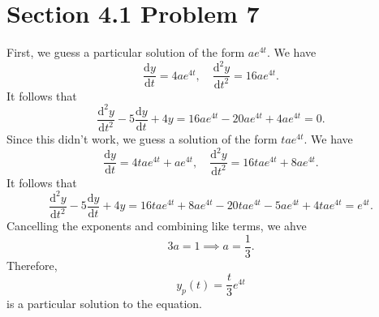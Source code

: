 \documentclass[11pt, letterpaper]{report}
\begin{document}
\section*{Section 4.1 Problem 7}
First, we guess a particular solution of the form $ae^{4t}$. We have
\[
	\frac{\mathrm{d}y}{\mathrm{d}t} =4ae^{4t},\quad \frac{\mathrm{d}^2y}{\mathrm{d}t^2} =16ae^{4t}
.\]
It follows that
\[
	\frac{\mathrm{d}^2y}{\mathrm{d}t^2} -5 \frac{\mathrm{d}y}{\mathrm{d}t} +4y=16ae^{4t}-20ae^{4t}+4ae^{4t}=0
.\]
Since this didn't work, we guess a solution of the form $tae^{4t}$. We have
\[
	\frac{\mathrm{d}y}{\mathrm{d}t} =4tae^{4t}+ae^{4t},\quad \frac{\mathrm{d}^2y}{\mathrm{d}t^2} =16tae^{4t}+8ae^{4t}
.\]
It follows that
\[
	\frac{\mathrm{d}^2y}{\mathrm{d}t^2} -5 \frac{\mathrm{d}y}{\mathrm{d}t} +4y=16tae^{4t}+8ae^{4t}-20tae^{4t}-5ae^{4t}+4tae^{4t}=e^{4t}
.\]
Cancelling the exponents and combining like terms, we ahve
\[
	3a=1\implies a=\frac{1}{3}
.\]
Therefore,
\[
	y_p(t)=\frac{t}{3}e^{4t}
\]
is a particular solution to the equation.
\end{document}

